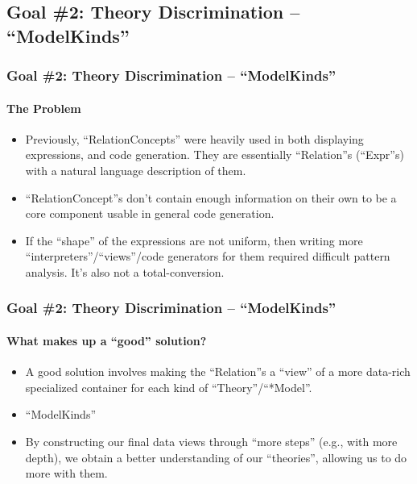 \documentclass{beamer}
\begin{document}
\subsection{Goal \#2: Theory Discrimination -- ``ModelKinds''}

\begin{frame}
    \frametitle{Goal \#2: Theory Discrimination -- ``ModelKinds''}
    \framesubtitle{The Problem}
    
    \begin{itemize}
        \item<2-> Previously, ``RelationConcepts'' were heavily used in both displaying expressions, and code generation. They are essentially ``Relation''s (``Expr''s) with a natural language description of them.
        \item<3-> ``RelationConcept''s don't contain enough information on their own to be a core component usable in general code generation.
        \item<4-> If the ``shape'' of the expressions are not uniform, then writing more ``interpreters''/``views''/code generators for them required difficult pattern analysis. It's also not a total-conversion.
    \end{itemize}
\end{frame}

\begin{frame}
    \frametitle{Goal \#2: Theory Discrimination -- ``ModelKinds''}
    \framesubtitle{What makes up a ``good'' solution?}
    
    \begin{itemize}
        \item<2-> A good solution involves making the ``Relation''s a ``view'' of a more data-rich specialized container for each kind of ``Theory''/``*Model''.
        \item<3-> ``ModelKinds''
        \item<4-> By constructing our final data views through ``more steps'' (e.g., with more depth), we obtain a better understanding of our ``theories'', allowing us to do more with them.
    \end{itemize}
\end{frame}
\end{document}
